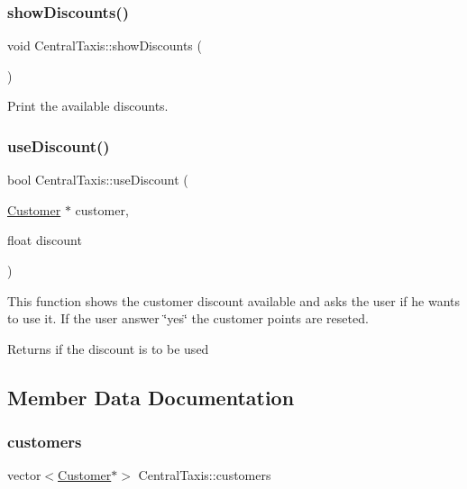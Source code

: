 \subsubsection{\texorpdfstring{show\+Discounts()}{showDiscounts()}}
{\footnotesize\ttfamily void Central\+Taxis\+::show\+Discounts (\begin{DoxyParamCaption}{ }\end{DoxyParamCaption})}

Print the available discounts. \hypertarget{classCentralTaxis_a29fcc5ee66cd32edfd78ef0eac650df9}{}\label{classCentralTaxis_a29fcc5ee66cd32edfd78ef0eac650df9} 
\subsubsection{\texorpdfstring{use\+Discount()}{useDiscount()}}
{\footnotesize\ttfamily bool Central\+Taxis\+::use\+Discount (\begin{DoxyParamCaption}\item[{\hyperlink{classCustomer}{Customer} $\ast$}]{customer,  }\item[{float}]{discount }\end{DoxyParamCaption})}

This function shows the customer discount available and asks the user if he wants to use it. If the user answer \char`\"{}yes\char`\"{} the customer points are reseted. \begin{DoxyReturn}{Returns}
if the discount is to be used 
\end{DoxyReturn}


\subsection{Member Data Documentation}
\hypertarget{classCentralTaxis_a5418c7eb3c09a2037e4802630c53f5ee}{}\label{classCentralTaxis_a5418c7eb3c09a2037e4802630c53f5ee} 
\subsubsection{\texorpdfstring{customers}{customers}}
{\footnotesize\ttfamily vector$<$\hyperlink{classCustomer}{Customer}$\ast$$>$ Central\+Taxis\+::customers\hspace{0.3cm}{\ttfamily [private]}}

